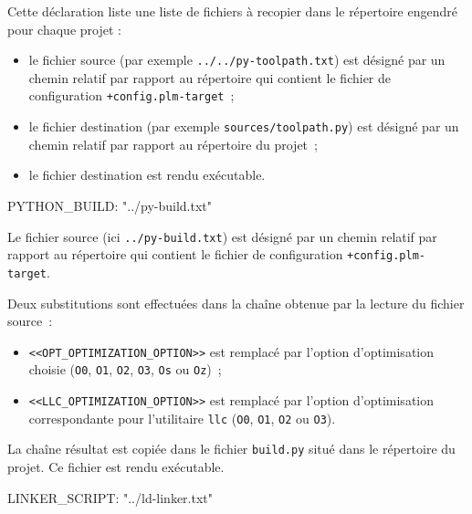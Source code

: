 Cette déclaration liste une liste de fichiers à recopier dans le répertoire engendré pour chaque projet :
\begin{itemize}
  \item le fichier source (par exemple \texttt{../../py-toolpath.txt}) est désigné par un chemin relatif par rapport au répertoire qui contient le fichier de configuration \texttt{+config.plm-target}~;
  \item le fichier destination (par exemple \texttt{sources/toolpath.py}) est désigné par un chemin relatif par rapport au répertoire du projet~;
  \item le fichier destination est rendu exécutable.
\end{itemize}






\begin{PLM}
PYTHON_BUILD:
   "../py-build.txt"
\end{PLM}

Le fichier source (ici \texttt{../py-build.txt}) est désigné par un chemin relatif par rapport au répertoire qui contient le fichier de configuration \texttt{+config.plm-target}.

Deux substitutions sont effectuées dans la chaîne obtenue par la lecture du fichier source~:
\begin{itemize}
  \item \texttt{<<OPT\_OPTIMIZATION\_OPTION>>} est remplacé par l'option d'optimisation choisie (\texttt{O0}, \texttt{O1}, \texttt{O2}, \texttt{O3}, \texttt{Os} ou \texttt{Oz})~;
  \item \texttt{<<LLC\_OPTIMIZATION\_OPTION>>} est remplacé par l'option d'optimisation correspondante pour l'utilitaire \texttt{llc} (\texttt{O0}, \texttt{O1}, \texttt{O2} ou \texttt{O3}).
\end{itemize}


La chaîne résultat est copiée dans le fichier \texttt{build.py} situé dans le répertoire du projet. Ce fichier est rendu exécutable.










\begin{PLM}
LINKER_SCRIPT:
  "../ld-linker.txt"
\end{PLM}

